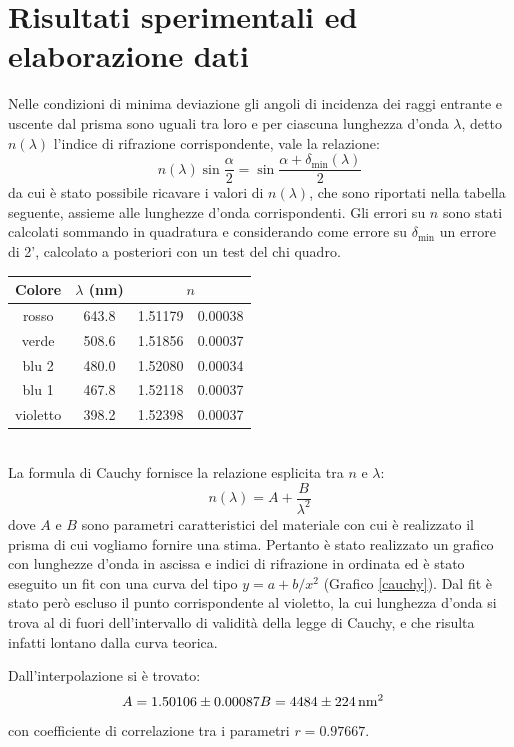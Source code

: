 \documentclass[italian,a4paper]{article}
\begin{document}
\section{Risultati sperimentali ed elaborazione dati}
Nelle condizioni di minima deviazione gli angoli di incidenza dei raggi entrante e uscente dal prisma sono uguali tra loro e per ciascuna lunghezza d'onda $\lambda$, detto $n(\lambda)$ l'indice di rifrazione corrispondente, vale la relazione:
\begin{equation*}
n(\lambda)\sin\dfrac{\alpha}{2}=\sin\dfrac{\alpha+\delta_{\min}(\lambda)}{2}
\end{equation*}
da cui è stato possibile ricavare i valori di $n(\lambda)$, che sono riportati nella tabella seguente, assieme alle lunghezze d'onda corrispondenti. Gli errori su $n$ sono stati calcolati sommando in quadratura e considerando come errore su $\delta_{\min}$ un errore di 2', calcolato a posteriori con un test del chi quadro.
\begin{table}[!h]
\centering
\renewcommand{\arraystretch}{1.2}
\begin{tabular}{ccr@{ $\pm$ }l}
Colore&		$\lambda$ (\unit{nm})&	\multicolumn{2}{c}{$n$}\\\hline
rosso&		643.8&			1.51179 &0.00038 \\
verde&		508.6&			1.51856 &0.00037 \\
blu 2&		480.0&			1.52080 &0.00034 \\
blu 1&		467.8&			1.52118 &0.00037 \\
violetto&	398.2&			1.52398 &0.00037
\end{tabular}
\end{table}\\
La formula di Cauchy fornisce la relazione esplicita tra $n$ e $\lambda$:
\begin{equation*}
n(\lambda)=A+\dfrac{B}{\lambda^2}
\end{equation*}
dove $A$ e $B$ sono parametri caratteristici del materiale con cui è realizzato il prisma di cui vogliamo fornire una stima.
Pertanto è stato realizzato un grafico con lunghezze d'onda in ascissa e indici di rifrazione in ordinata ed è stato eseguito un fit con una curva del tipo $y=a+b/x^2$ (Grafico \ref{cauchy}). Dal fit è stato però escluso il punto corrispondente al violetto, la cui lunghezza d'onda si trova al di fuori dell'intervallo di validità della legge di Cauchy, e che risulta infatti lontano dalla curva teorica.

Dall'interpolazione si è trovato:
\begin{eqnarray*}
A = 1.50106 \pm 0.00087&
B = \unit[4484 \pm 224]{nm^2}
\end{eqnarray*}
con coefficiente di correlazione tra i parametri $r=0.97667$.
\end{document}
